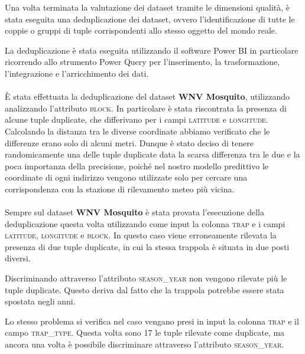 Una volta terminata la valutazione dei dataset tramite le dimensioni qualità, è stata eseguita una deduplicazione dei dataset, ovvero l'identificazione di tutte le coppie o gruppi di tuple corrispondenti allo stesso oggetto del mondo reale.

La deduplicazione è stata eseguita utilizzando il software Power BI in particolare ricorrendo allo strumento Power Query per l'inserimento, la trasformazione, l'integrazione e l'arricchimento dei dati.
\\\\	
È stata effettuata la deduplicazione del dataset \textbf{WNV Mosquito}, utilizzando analizzando l'attributo \textsc{block}. In particolare è stata riscontrata la presenza di alcune tuple duplicate, che differivano per i campi \textsc{latitude} e \textsc{longitude}. Calcolando la distanza tra le diverse coordinate abbiamo verificato che le differenze erano solo di alcuni metri.
Dunque è stato deciso di tenere randomicamente una delle tuple duplicate data la scarsa differenza tra le due e la poca importanza della precisione, poiché nel nostro modello predittivo le coordinate di ogni indirizzo vengono utilizzate solo per cercare una corrispondenza con la stazione di rilevamento meteo più vicina.
\\\\
Sempre sul dataset \textbf{WNV Mosquito} è stata provata l'esecuzione della deduplicazione questa volta utilizzando come input la colonna \textsc{trap} e i campi \textsc{latitude}, \textsc{longitude} e \textsc{block}. In questo caso viene erroneamente rilevata la presenza di due tuple duplicate, in cui la stessa trappola è situata in due posti diversi. 

Discriminando attraverso l'attributo \textsc{season\_year} non vengono rilevate più le tuple duplicate. Questo deriva dal fatto che la trappola potrebbe essere stata spostata negli anni.

Lo stesso problema si verifica nel caso vengano presi in input la colonna \textsc{trap} e il campo \textsc{trap\_type}. Questa volta sono 17 le tuple rilevate come duplicate, ma ancora una volta è possibile discriminare attraverso l'attributo \textsc{season\_year}.
